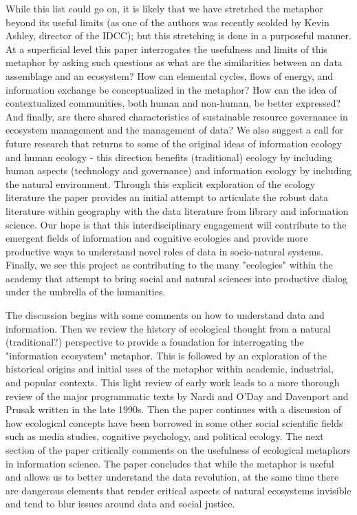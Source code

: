 While this list could go on, it is likely that we have stretched the metaphor beyond its useful limits (as one of the authors was recently scolded by Kevin Ashley, director of the IDCC); but this stretching is done in a purposeful manner. At a superficial level this paper interrogates the usefulness and limits of this metaphor by asking such questions as what are the similarities between an data assemblage and an ecosystem? How can elemental cycles, flows of energy, and information exchange be conceptualized in the metaphor? How can the idea of contextualized communities, both human and non-human, be better expressed? And finally, are there shared characteristics of sustainable resource governance in ecosystem management and the management of data? We also suggest a call for future research that returns to some of the original ideas of information ecology and human ecology - this direction benefits (traditional) ecology by including human aspects (technology and governance) and information ecology by including the natural environment. Through this explicit exploration of the ecology literature the paper provides an initial attempt to articulate the robust data literature within geography with the data literature from library and information science. Our hope is that this interdisciplinary engagement will contribute to the emergent fields of information and cognitive ecologies and provide more productive ways to understand novel roles of data in socio-natural systems. Finally, we see this project as contributing to the many "ecologies" within the academy that attempt to bring social and natural sciences into productive dialog under the umbrella of the humanities.

The discussion begins with some comments on how to understand data and information. Then we review the history of ecological thought from a natural (traditional?) perspective to provide a foundation for interrogating the "information ecosystem" metaphor. This is followed by an exploration of the historical origins and initial uses of the metaphor within academic, industrial, and popular contexts. This light review of early work leads to a more thorough review of the major programmatic texts by Nardi and O'Day and Davenport and Prusak written in the late 1990s. Then the paper continues with a discussion of how ecological concepts have been borrowed in some other social scientific fields such as media studies, cognitive psychology, and political ecology. The next section of the paper critically comments on the usefulness of ecological metaphors in information science. The paper concludes that while the metaphor is useful and allows us to better understand the data revolution, at the same time there are dangerous elements that render critical aspects of natural ecosystems invisible and tend to blur issues around data and social justice.
